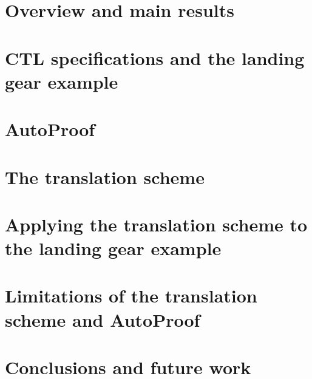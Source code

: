 \section{Overview and main results}
\label{sec:overview}


\section{CTL specifications and the landing gear example}
\label{sec:landing_gear_example}

\cite{arcaini2014modeling}

\section{AutoProof}
\label{sec:autoproof}

\cite{tschannen2015autoproof}

\section{The translation scheme}
\label{sec:translation_scheme}

\section{Applying the translation scheme to the landing gear example}
\label{sec:applying_to_example}

\section{Limitations of the translation scheme and AutoProof}
\label{sec:limitations}



\section{Conclusions and future work}
\label{sec:conclusions}


{{{
	
	
}}}


